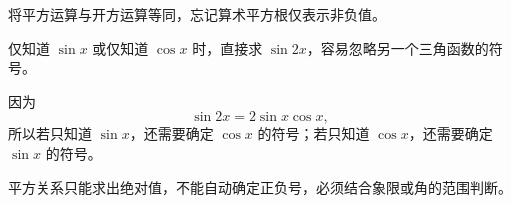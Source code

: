\begin{trapbox}
\begin{description}[style=nextline, leftmargin=2.8em, labelsep=0.5em, itemsep=0.35em]
		\item[\textbf{\textcolor{CTrap}{错因分析（忽视平方根双重性）：}}]
		      将平方运算与开方运算等同，忘记算术平方根仅表示非负值。
	\end{description}

	\medskip
	\begin{description}[style=nextline, leftmargin=2.8em, labelsep=0.5em, itemsep=0.35em]
		\item[\textbf{\textcolor{CTrap}{易错点四（只知一个函数值就求倍角）：}}]
		      仅知道 $\sin x$ 或仅知道 $\cos x$ 时，直接求 $\sin 2x$，容易忽略另一个三角函数的符号。

		\item[\textbf{\textcolor{CTrap}{正确理解（需要象限信息）：}}]
		      因为
		      \[
			      \sin2x=2\sin x\cos x,
		      \]
		      所以若只知道 $\sin x$，还需要确定 $\cos x$ 的符号；若只知道 $\cos x$，还需要确定 $\sin x$ 的符号。

		\item[\textbf{\textcolor{CTrap}{错因分析（符号判断不足）：}}]
		      平方关系只能求出绝对值，不能自动确定正负号，必须结合象限或角的范围判断。
	\end{description}

\end{trapbox}